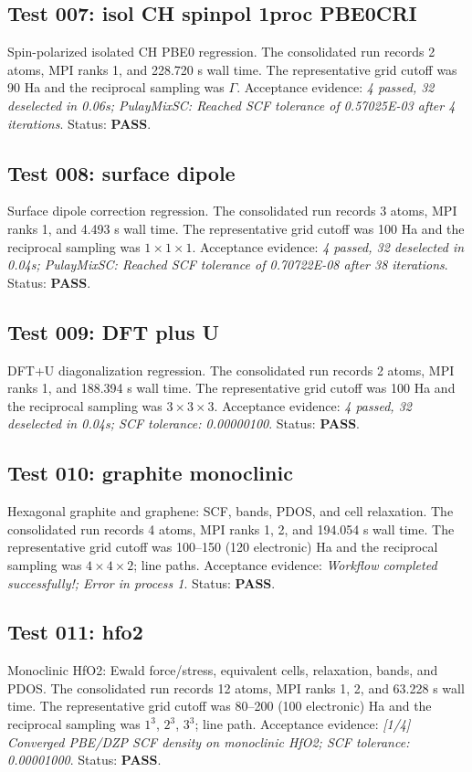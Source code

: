 \documentclass[aps,prb,preprint,superscriptaddress,longbibliography,floatfix]{revtex4-2}
\begin{document}
\subsection{Test 007: isol CH spinpol 1proc PBE0CRI}
Spin-polarized isolated CH PBE0 regression. The consolidated run records 2 atoms, MPI ranks 1, and 228.720 s wall time. The representative grid cutoff was 90 Ha and the reciprocal sampling was $\Gamma$. Acceptance evidence: \emph{4 passed, 32 deselected in 0.06s; PulayMixSC: Reached SCF tolerance of 0.57025E-03 after 4 iterations}. Status: \textbf{PASS}.

\subsection{Test 008: surface dipole}
Surface dipole correction regression. The consolidated run records 3 atoms, MPI ranks 1, and 4.493 s wall time. The representative grid cutoff was 100 Ha and the reciprocal sampling was $1\times1\times1$. Acceptance evidence: \emph{4 passed, 32 deselected in 0.04s; PulayMixSC: Reached SCF tolerance of 0.70722E-08 after 38 iterations}. Status: \textbf{PASS}.

\subsection{Test 009: DFT plus U}
DFT+U diagonalization regression. The consolidated run records 2 atoms, MPI ranks 1, and 188.394 s wall time. The representative grid cutoff was 100 Ha and the reciprocal sampling was $3\times3\times3$. Acceptance evidence: \emph{4 passed, 32 deselected in 0.04s; SCF tolerance: 0.00000100}. Status: \textbf{PASS}.

\subsection{Test 010: graphite monoclinic}
Hexagonal graphite and graphene: SCF, bands, PDOS, and cell relaxation. The consolidated run records 4 atoms, MPI ranks 1, 2, and 194.054 s wall time. The representative grid cutoff was 100--150 (120 electronic) Ha and the reciprocal sampling was $4\times4\times2$; line paths. Acceptance evidence: \emph{Workflow completed successfully!; Error in process 1}. Status: \textbf{PASS}.

\subsection{Test 011: hfo2}
Monoclinic HfO2: Ewald force/stress, equivalent cells, relaxation, bands, and PDOS. The consolidated run records 12 atoms, MPI ranks 1, 2, and 63.228 s wall time. The representative grid cutoff was 80--200 (100 electronic) Ha and the reciprocal sampling was $1^3$, $2^3$, $3^3$; line path. Acceptance evidence: \emph{[1/4] Converged PBE/DZP SCF density on monoclinic HfO2; SCF tolerance: 0.00001000}. Status: \textbf{PASS}.
\end{document}
